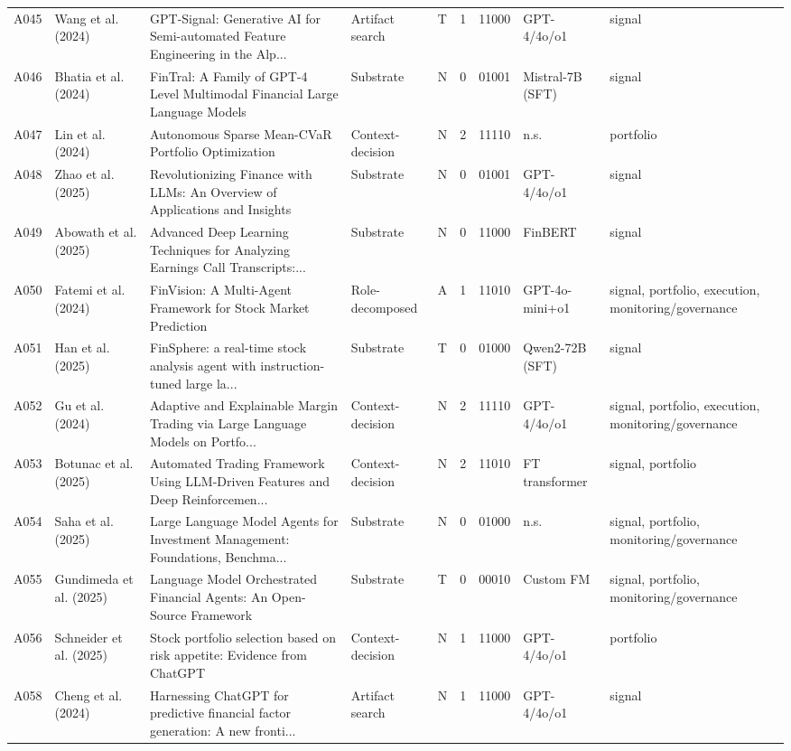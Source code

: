 \begin{longtable}{p{0.7cm} p{1.9cm} p{3.85cm} p{1.7cm} p{0.65cm} p{0.55cm} p{1.2cm} p{1.8cm} p{2.0cm}}
A045 & Wang et al. (2024) & GPT-Signal: Generative AI for Semi-automated Feature Engineering in the Alp... & Artifact search & T & 1 & 11000 & GPT-4/4o/o1 & signal \\
A046 & Bhatia et al. (2024) & FinTral: A Family of GPT-4 Level Multimodal Financial Large Language Models & Substrate & N & 0 & 01001 & Mistral-7B (SFT) & signal \\
A047 & Lin et al. (2024) & Autonomous Sparse Mean-CVaR Portfolio Optimization & Context-decision & N & 2 & 11110 & n.s. & portfolio \\
A048 & Zhao et al. (2025) & Revolutionizing Finance with LLMs: An Overview of Applications and Insights & Substrate & N & 0 & 01001 & GPT-4/4o/o1 & signal \\
A049 & Abowath et al. (2025) & Advanced Deep Learning Techniques for Analyzing Earnings Call Transcripts:... & Substrate & N & 0 & 11000 & FinBERT & signal \\
A050 & Fatemi et al. (2024) & FinVision: A Multi-Agent Framework for Stock Market Prediction & Role-decomposed & A & 1 & 11010 & GPT-4o-mini+o1 & signal, portfolio, execution, monitoring/governance \\
A051 & Han et al. (2025) & FinSphere: a real-time stock analysis agent with instruction-tuned large la... & Substrate & T & 0 & 01000 & Qwen2-72B (SFT) & signal \\
A052 & Gu et al. (2024) & Adaptive and Explainable Margin Trading via Large Language Models on Portfo... & Context-decision & N & 2 & 11110 & GPT-4/4o/o1 & signal, portfolio, execution, monitoring/governance \\
A053 & Botunac et al. (2025) & Automated Trading Framework Using LLM-Driven Features and Deep Reinforcemen... & Context-decision & N & 2 & 11010 & FT transformer & signal, portfolio \\
A054 & Saha et al. (2025) & Large Language Model Agents for Investment Management: Foundations, Benchma... & Substrate & N & 0 & 01000 & n.s. & signal, portfolio, monitoring/governance \\
A055 & Gundimeda et al. (2025) & Language Model Orchestrated Financial Agents: An Open-Source Framework & Substrate & T & 0 & 00010 & Custom FM & signal, portfolio, monitoring/governance \\
A056 & Schneider et al. (2025) & Stock portfolio selection based on risk appetite: Evidence from ChatGPT & Context-decision & N & 1 & 11000 & GPT-4/4o/o1 & portfolio \\
A058 & Cheng et al. (2024) & Harnessing ChatGPT for predictive financial factor generation: A new fronti... & Artifact search & N & 1 & 11000 & GPT-4/4o/o1 & signal \\

\end{longtable}
